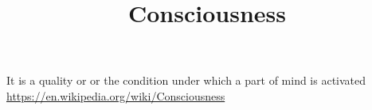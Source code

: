 \documentclass[a4paper]{article}
\title{Consciousness}
\date{}
\begin{document}
    \maketitle
    It is a quality or or the condition under which a part of mind is activated
    \url{https://en.wikipedia.org/wiki/Consciousness}
\end{document}
